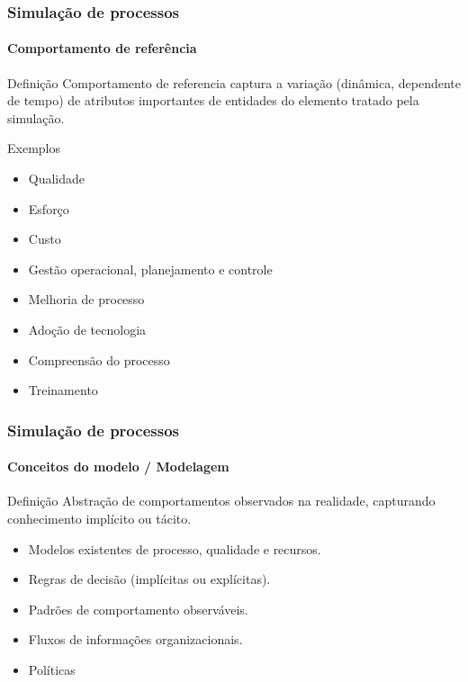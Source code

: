 \begin{frame}
	\frametitle{Simulação de processos}
	\framesubtitle{Comportamento de referência}
	
	\begin{block:concept}{Definição}
		Comportamento de referencia captura a variação (dinâmica, dependente de
		tempo) de atributos	importantes de entidades do elemento tratado pela simulação.
	\end{block:concept}
	
	\begin{block:fact}{Exemplos}
		\begin{itemize}
			\item Qualidade
			\item Esforço
			\item Custo
			
			\item Gestão operacional, planejamento e controle
			\item Melhoria de processo
			\item Adoção de tecnologia
			\item Compreensão do processo
			\item Treinamento
		\end{itemize}
	\end{block:fact}
\end{frame}


\begin{frame}
	\frametitle{Simulação de processos}
	\framesubtitle{Conceitos do modelo / Modelagem}
	
	\begin{block:concept}{Definição}
		Abstração de comportamentos observados na realidade, capturando conhecimento
		implícito ou tácito.
	\end{block:concept}
	
	\begin{block:fact}{}
		\begin{itemize}
			\item Modelos existentes de processo, qualidade e recursos.
			\item Regras de decisão (implícitas ou explícitas).
			\item Padrões de comportamento observáveis.
			\item Fluxos de informações organizacionais.
			\item Políticas
		\end{itemize}
	\end{block:fact}
\end{frame}



